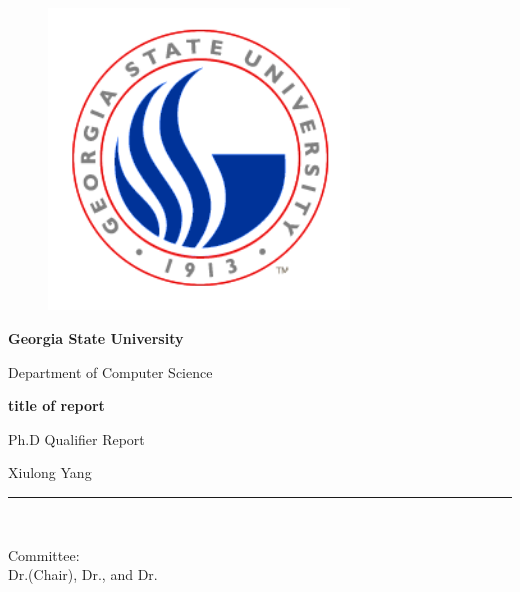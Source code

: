 \documentclass[11pt, english]{article}
\begin{document}
\setlength\parskip{.3\baselineskip}
\begin{titlepage}

\begin{center}
\begin{figure}[htb]
\begin{center}
\includegraphics[width=8cm]{gsu_c_logo}
\end{center}
\end{figure}

\begin{Large}
\textbf{Georgia State University} \\
\end{Large}
Department of Computer Science \\
\vspace*{0.2in}
\begin{Large}
\textbf{title of report} \\
\end{Large}
\vspace*{0.3in}
\begin{large}
Ph.D Qualifier Report\\
\end{large}
\vspace*{0.3in}
\begin{large}
Xiulong Yang\\
\end{large}
\vspace*{0.3in}
\rule{80mm}{0.1mm}\\
\vspace*{0.1in}
\begin{large}
Committee:\\
\vspace*{0.1in}
Dr.(Chair), Dr., and Dr.\\
\end{large}
\end{center}
\end{titlepage}
\end{document}
